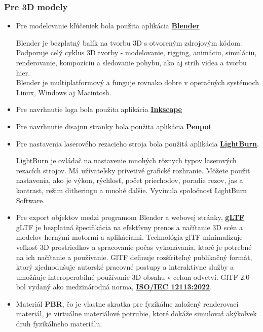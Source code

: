       \subsubsection{Pre 3D modely}
        \begin{itemize}
          \item{
            Pre modelovanie kľúčeniek bola použita aplikácia \textbf{\href{https://www.blender.org/}{Blender}}

            Blender je bezplatný balík na tvorbu 3D s otvoreným zdrojovým kódom. Podporuje celý cyklus 3D tvorby - modelovanie, rigging, animáciu, simuláciu, renderovanie, kompozíciu a sledovanie pohybu, ako aj strih videa a tvorbu hier. \\
            Blender je multiplatformový a funguje rovnako dobre v operačných systémoch Linux, Windows aj Macintosh.
          }
          \item{
              Pre navrhnutie loga bola použita aplikácia \textbf{\href{https://inkscape.org/}{Inkscape}}
          }
          \item{
              Pre navrhnutie disajnu stranky bola použita aplikácia \textbf{\href{https://penpot.app/}{Penpot}}
          }
          \item{
            Pre nastavenia laserového rezacieho stroja bola použitá aplikácia \textbf{\href{https://lightburnsoftware.com/}{LightBurn}}.

            LightBurn je ovládač na nastavenie mnohých rôznych typov laserových rezacích strojov. Má užívateľsky prívetivé grafické rozhranie. Môžete použiť nastavenia, ako je výkon, rýchlosť, počet priechodov, poradie rezov, jas a kontrast, režim ditheringu a mnohé ďalšie. Vyvinula spoločnosť LightBurn Software.
          }
          \item{
            Pre export objektov medzi programom Blender a webovej stránky, \textbf{\href{https://www.khronos.org/gltf/}{gLTF}}
            gLTF je bezplatná špecifikácia na efektívny prenos a načítanie 3D scén a modelov hernými motormi a aplikáciami. Technológia glTF minimalizuje veľkosť 3D prostriedkov a spracovanie počas vykonávania, ktoré je potrebné na ich načítanie a používanie. GlTF definuje rozšíriteľný publikačný formát, ktorý zjednodušuje autorské pracovné postupy a interaktívne služby a umožňuje interoperabilné používanie 3D obsahu v celom odvetví. GlTF 2.0 bol vydaný ako medzinárodná norma, \textbf{\href{\https://www.iso.org/standard/83990.html}{ISO/IEC 12113:2022}}.
          }
          \item{
            Materiál \textbf{PBR}, čo je vlastne skratka pre fyzikálne založený renderovací materiál, je virtuálne materiálové potrubie, ktoré dokáže simulovať akýkoľvek druh fyzikálneho materiálu.
          }
        \end{itemize}

